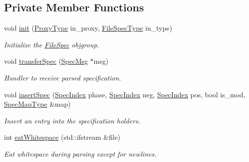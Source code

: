 \subsection*{Private Member Functions}
\begin{DoxyCompactItemize}
\item 
void \hyperlink{structvt_1_1utils_1_1file__spec_1_1_file_spec_ad807058ebbd7f433273140b1995c4e26}{init} (\hyperlink{structvt_1_1utils_1_1file__spec_1_1_file_spec_ac4ad61ed146069ab671ec1bf909ebded}{Proxy\+Type} in\+\_\+proxy, \hyperlink{namespacevt_1_1utils_1_1file__spec_adc8912eb2949ca15d0f29afc0342f71e}{File\+Spec\+Type} in\+\_\+type)
\begin{DoxyCompactList}\small\item\em Initialize the {\ttfamily \hyperlink{structvt_1_1utils_1_1file__spec_1_1_file_spec}{File\+Spec}} objgroup. \end{DoxyCompactList}\item 
void \hyperlink{structvt_1_1utils_1_1file__spec_1_1_file_spec_a2cc6d29fdfe7d69bb6ff93d35065011a}{transfer\+Spec} (\hyperlink{structvt_1_1utils_1_1file__spec_1_1_file_spec_1_1_spec_msg}{Spec\+Msg} $\ast$msg)
\begin{DoxyCompactList}\small\item\em Handler to receive parsed specification. \end{DoxyCompactList}\item 
void \hyperlink{structvt_1_1utils_1_1file__spec_1_1_file_spec_ae441bc1398b54dd7acf2f1e34d4ef6ce}{insert\+Spec} (\hyperlink{structvt_1_1utils_1_1file__spec_1_1_file_spec_a3817fca09dbe932e0f6ba5729f1965ba}{Spec\+Index} phase, \hyperlink{structvt_1_1utils_1_1file__spec_1_1_file_spec_a3817fca09dbe932e0f6ba5729f1965ba}{Spec\+Index} neg, \hyperlink{structvt_1_1utils_1_1file__spec_1_1_file_spec_a3817fca09dbe932e0f6ba5729f1965ba}{Spec\+Index} pos, bool is\+\_\+mod, \hyperlink{structvt_1_1utils_1_1file__spec_1_1_file_spec_a368a4ab8bf689e0b533abac71ae9393b}{Spec\+Map\+Type} \&map)
\begin{DoxyCompactList}\small\item\em Insert an entry into the specification holders. \end{DoxyCompactList}\item 
int \hyperlink{structvt_1_1utils_1_1file__spec_1_1_file_spec_a8e57a8e3efd0e8dc640419de684d6490}{eat\+Whitespace} (std\+::ifstream \&file)
\begin{DoxyCompactList}\small\item\em Eat whitespace during parsing except for newlines. \end{DoxyCompactList}\end{DoxyCompactItemize}
